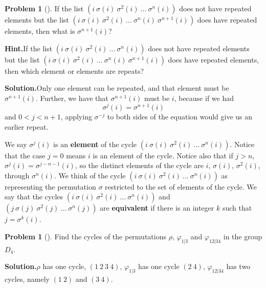 \documentclass[10pt,]{book}
\newcommand{\terminology}[1]{\textbf{#1}}
\theoremstyle{plain}
\theoremstyle{definition}
\newtheorem{activity}[project]{Problem}
\theoremstyle{definition}
\numberwithin{equation}{chapter}
\newcommand{\lt}{<}
\newcommand{\gt}{>}
\begin{document}
\begin{activity}[]\label{activity-272}
If the list \((i\ \sigma(i)\ \sigma^2(i)\ \ldots\ \sigma^n(i))\) does not have repeated elements but the list \((i\ \sigma(i)\ \sigma^2(i)\ \ldots\ \sigma^n(i)\ \sigma^{n+1}(i))\) does have repeated elements, then what is \(\sigma^{n+1}(i)\)?%
\par\medskip\noindent%
\textbf{Hint.}\quad If the list \((i\ \sigma(i)\ \sigma^2(i)\ \ldots\ \sigma^n(i))\) does not have repeated elements but the list \((i\ \sigma(i)\ \sigma^2(i)\ \ldots\ \sigma^n(i)\ \sigma^{n+1}(i))\) does have repeated elements, then which element or elements are repeats?%
\par\medskip\noindent%
\textbf{Solution.}\quad Only one element can be repeated, and that element must be \(\sigma^{n+1}(i)\).  Further, we have that \(\sigma^{n+1}(i)\) must be \(i\), because if we had%
\begin{equation*}
\sigma^j(i) = \sigma^{n+1}(i)
\end{equation*}
and \(0 \lt j \lt n+1\), applying \(\sigma^{-j}\) to both sides of the equation would give us an earlier repeat.%
\end{activity}
We say \(\sigma^j(i)\) is an \terminology{element} of the cycle \((i\ \sigma(i)\ \sigma^2(i)\ \ldots\ \sigma^n(i))\).  Notice that the case \(j=0\) means \(i\) is an element of the cycle.  Notice also that if \(j\gt n\), \(\sigma^j(i) = \sigma^{j-n-1}(i)\), so the distinct elements of the cycle are \(i\), \(\sigma(i)\), \(\sigma^2(i)\), through \(\sigma^n(i)\). We think of the cycle \((i\ \sigma(i)\ \sigma^2(i)\ \ldots\ \sigma^n(i))\) as representing the permutation \(\sigma\) restricted to the set of elements of the cycle. We say that the cycles \((i\
\sigma(i)\
\sigma^2(i)\ \ldots\ \sigma^n(i))\) and \((j\
\sigma(j)\
\sigma^2(j)\ \ldots\ \sigma^n(j))\) are \terminology{equivalent} if there is an integer \(k\) such that \(j=
\sigma^k(i)\).%
\begin{activity}[]\label{d4-cycles}
Find the cycles of the permutations \(\rho\), \(\varphi_{1|3}\) and \(\varphi_{12|34}\) in the group \(D_4\).%
\par\medskip\noindent%
\textbf{Solution.}\quad \(\rho\) has one cycle, \((1\ 2\ 3\ 4)\), \(\varphi_{1|3}\) has one cycle \((2\ 4)\), \(\varphi_{12|34}\) has two cycles, namely \((1\ 2)\) and \((3\ 4)\).%
\end{activity}
\end{document}
